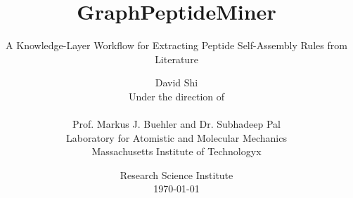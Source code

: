 
\title{GraphPeptideMiner}
\subtitle{A Knowledge-Layer Workflow for Extracting Peptide Self-Assembly Rules from Literature}

\author{
David Shi
\vspace{0.5in}\\
Under the direction of\\
\\
Prof. Markus J. Buehler and Dr. Subhadeep Pal \\
Laboratory for Atomistic and Molecular Mechanics \\
Massachusetts Institute of Technologyx \\
\vspace{1in}
}

\date{
Research Science Institute\\
\today
}

